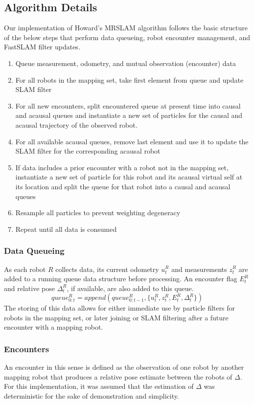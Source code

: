 \subsection{Algorithm Details}
\label{SS:Alg:Details}
Our implementation of Howard's MRSLAM algorithm follows the basic structure of the below steps that perform data queueing, robot encounter management, and FastSLAM filter updates.
\begin{enumerate}
\item Queue measurement, odometry, and mutual observation (encounter) data
\item For all robots in the mapping set, take first element from queue and update SLAM filter
\item For all new encounters, split encountered queue at present time into causal and acausal queues and instantiate a new set of particles for the causal and acausal trajectory of the observed robot.
\item For all available acausal queues, remove last element and use it to update the SLAM filter for the corresponding acausal robot
\item If data includes a prior encounter with a robot not in the mapping set, instantiate a new set of particle for this robot and its acausal virtual self at its location and split the queue for that robot into a causal and acausal queues
\item Resample all particles to prevent weighting degeneracy
\item Repeat until all data is consumed
\end{enumerate}
\vspace{0.1in}
\subsubsection{Data Queueing}
As each robot $R$ collects data, its current odometry $u_t^R$ and measurements $z_t^R$ are added to a running queue data structure before processing. An encounter flag $E_t^R$ and relative pose $\Delta_t^R$, if available, are also added to this queue. 
$$queue_{0:t}^R = append(queue_{0:t-1}^R, \{ u_t^R, z_t^R, E_t^R, \Delta_t^R \})$$
The storing of this data allows for either immediate use by particle filters for robots in the mapping set, or later joining or SLAM filtering after a future encounter with a mapping robot.
\vspace{0.1in}
\subsubsection{Encounters}
An encounter in this sense is defined as the observation of one robot by another mapping robot that produces a relative pose estimate between the robots of $\Delta$. For this implementation, it was assumed that the estimation of $\Delta$ was deterministic for the sake of demonstration and simplicity.

